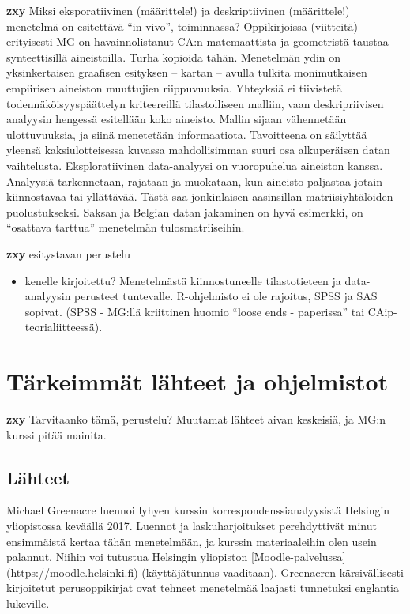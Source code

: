 \documentclass[
  finnish,
]{book}
\providecommand{\tightlist}{%
  \setlength{\itemsep}{0pt}\setlength{\parskip}{0pt}}
\begin{document}
\textbf{zxy} Miksi eksporatiivinen (määrittele!) ja deskriptiivinen (määrittele!) menetelmä on esitettävä ``in vivo'', toiminnassa? Oppikirjoissa (viitteitä) erityisesti MG on havainnolistanut CA:n matemaattista ja geometristä taustaa synteettisillä aineistoilla. Turha kopioida tähän. Menetelmän ydin on yksinkertaisen graafisen esityksen -- kartan -- avulla tulkita monimutkaisen empiirisen aineiston muuttujien riippuvuuksia. Yhteyksiä ei tiivistetä todennäköisyyspäättelyn kriteereillä tilastolliseen malliin, vaan deskripriivisen analyysin hengessä esitellään koko aineisto. Mallin sijaan vähennetään ulottuvuuksia, ja siinä menetetään informaatiota. Tavoitteena on säilyttää yleensä kaksiulotteisessa kuvassa mahdollisimman suuri osa alkuperäisen datan vaihtelusta. Eksploratiivinen data-analyysi on vuoropuhelua aineiston kanssa. Analyysiä tarkennetaan, rajataan ja muokataan, kun aineisto paljastaa jotain kiinnostavaa tai yllättävää. Tästä saa jonkinlaisen aasinsillan matriisiyhtälöiden puolustukseksi. Saksan ja Belgian datan jakaminen on hyvä esimerkki, on ``osattava tarttua'' menetelmän tulosmatriiseihin.

\textbf{zxy} esitystavan perustelu

\begin{itemize}
\tightlist
\item
  kenelle kirjoitettu? Menetelmästä kiinnostuneelle tilastotieteen ja data-analyysin perusteet tuntevalle. R-ohjelmisto ei ole rajoitus, SPSS ja SAS sopivat. (SPSS - MG:llä kriittinen huomio ``loose ends - paperissa'' tai CAip-teorialiitteessä).
\end{itemize}

\hypertarget{tuxe4rkeimmuxe4t-luxe4hteet-ja-ohjelmistot}{%
\section{Tärkeimmät lähteet ja ohjelmistot}\label{tuxe4rkeimmuxe4t-luxe4hteet-ja-ohjelmistot}}

\textbf{zxy} Tarvitaanko tämä, perustelu? Muutamat lähteet aivan keskeisiä, ja MG:n kurssi pitää mainita.

\hypertarget{luxe4hteet}{%
\subsection{Lähteet}\label{luxe4hteet}}

Michael Greenacre luennoi lyhyen kurssin korrespondenssianalyysistä Helsingin yliopistossa keväällä 2017\citep{RefWorks:doc:5b6ef091e4b0984fd9b8c0ca}. Luennot ja laskuharjoitukset perehdyttivät minut ensimmäistä kertaa tähän menetelmään, ja kurssin materiaaleihin olen usein palannut. Niihin voi tutustua Helsingin yliopiston {[}Moodle-palvelussa{]} (\url{https://moodle.helsinki.fi}) (käyttäjätunnus vaaditaan). Greenacren kärsivällisesti kirjoitetut perusoppikirjat ovat tehneet menetelmää laajasti tunnetuksi englantia lukeville.
\end{document}
